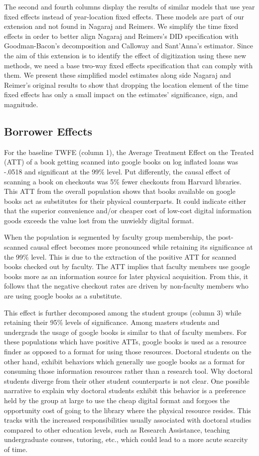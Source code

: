 \documentclass{article}
\begin{document}
The second and fourth columns display the results of similar models that use year fixed effects instead of year-location fixed effects. These models are part of our extension and not found in Nagaraj and Reimers. We simplify the time fixed effects in order to better align Nagaraj and Reimers's DID specification with Goodman-Bacon's decomposition and Calloway and Sant'Anna's estimator. Since the aim of this extension is to identify the effect of digitization using these new methods, we need a base two-way fixed effects specification that can comply with them. We present these simplified model estimates along side Nagaraj and Reimer's original results to show that dropping the location element of the time fixed effects has only a small impact on the estimates' significance, sign, and magnitude.

\subsection{Borrower Effects}
For the baseline TWFE (column 1), the Average Treatment Effect on the Treated (ATT) of a book getting scanned into google books on log inflated loans was -.0518 and significant at the 99\% level. Put differently, the causal effect of scanning a book on checkouts was 5\% fewer checkouts from Harvard libraries. This ATT from the overall population shows that books available on google books act as substitutes for their physical counterparts. It could indicate either that the superior convenience and/or cheaper cost of low-cost digital information goods exceeds the value lost from the unwieldy digital format. 

When the population is segmented by faculty group membership, the post-scanned causal effect becomes more pronounced while retaining its significance at the 99\% level. This is due to the extraction of the positive ATT for scanned books checked out by faculty. The ATT implies that faculty members use google books more as an information source for later physical acquisition. From this, it follows that the negative checkout rates are driven by non-faculty members who are using google books as a substitute. 

This effect is further decomposed among the student groups (column 3) while retaining their 95\% levels of significance. Among masters students and undergrads the usage of google books is similar to that of faculty members. For these populations which have positive ATTs, google books is used as a resource finder as opposed to a format for using those resources. Doctoral students on the other hand, exhibit behaviors which generally use google books as a format for consuming those information resources rather than a research tool. Why doctoral students diverge from their other student counterparts is not clear. One possible narrative to explain why doctoral students exhibit this behavior is a preference held by the group at large to use the cheap digital format and forgoes the opportunity cost of going to the library where the physical resource resides. This tracks with the increased responsibilities usually associated with doctoral studies compared to other education levels, such as Research Assistance, teaching undergraduate courses, tutoring, etc., which could lead to a more acute scarcity of time.
\end{document}
